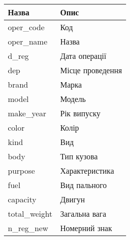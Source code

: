 \chapter{}

\begin{table}[ht!]
  \small
  \centering
  \begin{tabular}{|l|l|}
    \hline
    \textbf{Назва} & \textbf{Опис}\\ \hline
    oper\_code & Код\\               \hline
    oper\_name & Назва\\             \hline
    d\_reg & Дата операції\\         \hline
    dep & Місце проведення\\         \hline
    brand & Марка\\                  \hline
    model & Модель\\                 \hline
    make\_year & Рік випуску\\       \hline
    color & Колір\\                  \hline
    kind & Вид\\                     \hline
    body & Тип кузова\\              \hline
    purpose & Характеристика\\       \hline
    fuel & Вид пального\\            \hline
    capacity & Двигун\\              \hline
    total\_weight & Загальна вага\\  \hline
    n\_reg\_new & Номерний знак\\
    \hline
  \end{tabular}
  \caption{}
  \label{fig:csv-documet-structure}
\end{table}
